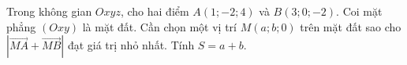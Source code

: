 \begin{ex}
Trong không gian $Oxyz$, cho hai điểm $A(1;-2;4)$ và $B(3;0;-2)$. Coi mặt phẳng $(Oxy)$ là mặt đất. Cần chọn một vị trí $M(a;b;0)$ trên mặt đất sao cho $|\overrightarrow{MA}+\overrightarrow{MB}|$ đạt giá trị nhỏ nhất. Tính $S=a+b$.
\end{ex}

